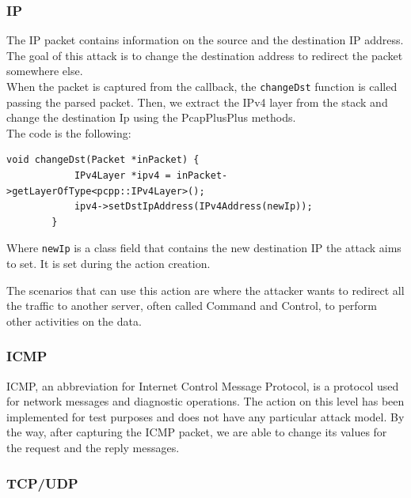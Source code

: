 \documentclass[12pt]{article}
\begin{document}
	\subsubsection{IP}
	The IP packet contains information on the source and the destination IP address. The goal of this attack is to change the destination address to redirect the packet somewhere else.\\
	When the packet is captured from the callback, the \lstinline{changeDst} function is called passing the parsed packet. Then, we extract the IPv4 layer from the stack and change the destination Ip using the PcapPlusPlus methods.\\
	The code is the following:
	\bigbreak

	\begin{lstlisting}[frame=single]
		void changeDst(Packet *inPacket) {
			IPv4Layer *ipv4 = inPacket->getLayerOfType<pcpp::IPv4Layer>();
			ipv4->setDstIpAddress(IPv4Address(newIp));
		}
	\end{lstlisting}
	\bigbreak

	Where \lstinline{newIp} is a class field that contains the new destination IP the attack aims to set. It is set during the action creation.

	\bigbreak
	The scenarios that can use this action are where the attacker wants to redirect all the traffic to another server, often called Command and Control, to perform other activities on the data.   
	
	\subsubsection{ICMP}
	ICMP, an abbreviation for Internet Control Message Protocol, is a protocol used for network messages and diagnostic operations. The action on this level has been implemented for test purposes and does not have any particular attack model. By the way, after capturing the ICMP packet, we are able to change its values for the request and the reply messages.

	\subsubsection{TCP/UDP}
	
\end{document}
